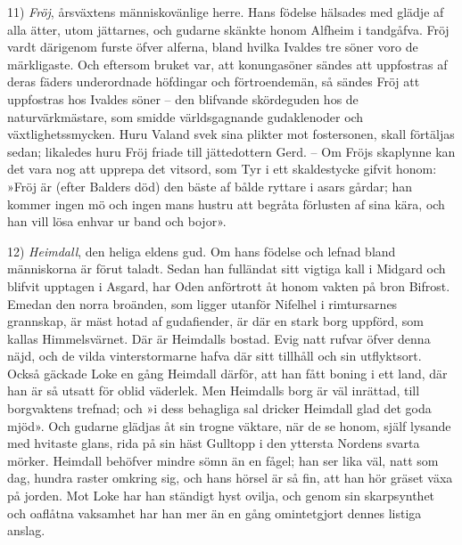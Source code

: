 11) \emph{Fröj}, årsväxtens människovänlige herre. Hans födelse hälsades
med glädje af alla ätter, utom jättarnes, och gudarne skänkte honom
Alfheim i tandgåfva. Fröj vardt därigenom furste öfver alferna, bland
hvilka Ivaldes tre söner voro de märkligaste. Och eftersom bruket var,
att konungasöner sändes att uppfostras af deras fäders underordnade
höfdingar och förtroendemän, så sändes Fröj att uppfostras hos Ivaldes
söner -- den blifvande skördeguden hos de naturvärkmästare, som smidde
världsgagnande gudaklenoder och växtlighetssmycken. Huru Valand svek
sina plikter mot
fostersonen\protect\hypertarget{lb1625905.xhtmlux5cux23start32}{}{}\protect\hypertarget{lb1625905.xhtmlux5cux23start32-a}{}{}\protect\hypertarget{lb1625905.xhtmlux5cux23start32-b}{}{}\protect\hypertarget{lb1625905.xhtmlux5cux23start32-c}{}{}\protect\hypertarget{lb1625905.xhtmlux5cux23start32-d}{}{},
skall förtäljas sedan; likaledes huru Fröj friade till jättedottern
Gerd. -- Om Fröjs skaplynne kan det vara nog att upprepa det vitsord,
som Tyr i ett skaldestycke gifvit honom: »Fröj är (efter Balders död)
den bäste af bålde ryttare i asars gårdar; han kommer ingen mö och ingen
mans hustru att begråta förlusten af sina kära, och han vill lösa enhvar
ur band och bojor».

12) \emph{Heimdall}, den heliga eldens gud. Om hans födelse och lefnad
bland människorna är förut taladt. Sedan han fulländat sitt vigtiga kall
i Midgard och blifvit upptagen i Asgard, har Oden anförtrott åt honom
vakten på bron Bifrost. Emedan den norra broänden, som ligger utanför
Nifelhel i rimtursarnes grannskap, är mäst hotad af gudafiender, är där
en stark borg uppförd, som kallas Himmelsvärnet. Där är Heimdalls
bostad. Evig natt rufvar öfver denna näjd, och de vilda vinterstormarne
hafva där sitt tillhåll och sin utflyktsort. Också gäckade Loke en gång
Heimdall därför, att han fått boning i ett land, där han är så utsatt
för oblid väderlek. Men Heimdalls borg är väl inrättad, till borgvaktens
trefnad; och »i dess behagliga sal dricker Heimdall glad det goda mjöd».
Och gudarne glädjas åt sin trogne väktare, när de se honom, själf
lysande med hvitaste glans, rida på sin häst Gulltopp i den yttersta
Nordens svarta mörker. Heimdall behöfver mindre sömn än en fågel; han
ser lika väl, natt som dag, hundra raster omkring sig, och hans hörsel
är så fin, att han hör gräset växa på jorden. Mot Loke har han ständigt
hyst ovilja, och genom sin skarpsynthet och oaflåtna vaksamhet har han
mer än en gång omintetgjort dennes listiga anslag.

